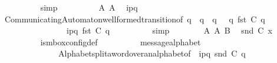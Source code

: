 \begin{isabellebody}
\ \ \ \ \ \ \ \ \isamarkupfalse%
\ simp\isanewline
\ \ \ \ \ \ \isamarkupfalse%
\ \isamarkupfalse%
\ A{}\ A{}\ \isamarkupfalse%
\ {\isachardoublequoteopen}i\isactrlbsup p{\isasymrightarrow}q\isactrlesup \ {\isasymin}\ {\isasymM}{\isachardoublequoteclose}\isanewline
\ \ \ \ \ \ \ \ \isamarkupfalse%
\ CommunicatingAutomaton{\isachardot}{\kern0pt}well{\isacharunderscore}{\kern0pt}formed{\isacharunderscore}{\kern0pt}transition{\isacharbrackleft}{\kern0pt}of\ q\ {\isachardoublequoteopen}{\isasymS}\ q{\isachardoublequoteclose}\ {\isachardoublequoteopen}{\isasymI}\ q{\isachardoublequoteclose}\ {\isasymM}\ {\isachardoublequoteopen}{\isasymR}\ q{\isachardoublequoteclose}\ {\isachardoublequoteopen}fst\ {\isacharparenleft}{\kern0pt}C{}\ q{\isacharparenright}{\kern0pt}{\isachardoublequoteclose}\isanewline
\ \ \ \ \ \ \ \ \ \ \ \ \ \ \ \ {\isachardoublequoteopen}{\isacharquery}{\kern0pt}{\isasymlangle}{\isacharparenleft}{\kern0pt}i\isactrlbsup p{\isasymrightarrow}q\isactrlesup {\isacharparenright}{\kern0pt}{\isasymrangle}{\isachardoublequoteclose}\ {\isachardoublequoteopen}fst\ {\isacharparenleft}{\kern0pt}C{}\ q{\isacharparenright}{\kern0pt}{\isachardoublequoteclose}{\isacharbrackright}{\kern0pt}\isanewline
\ \ \ \ \ \ \ \ \isamarkupfalse%
\ simp\isanewline
\ \ \ \ \ \ \isamarkupfalse%
\ A{}\ A{}\ B\ \isamarkupfalse%
\ {\isachardoublequoteopen}snd\ {\isacharparenleft}{\kern0pt}C{}\ x{\isacharparenright}{\kern0pt}\ {\isasymin}\ {\isasymM}\isactrlsup {\isacharasterisk}{\kern0pt}{\isachardoublequoteclose}\isanewline
\ \ \ \ \ \ \ \ \isamarkupfalse%
\ is{\isacharunderscore}{\kern0pt}mbox{\isacharunderscore}{\kern0pt}config{\isacharunderscore}{\kern0pt}def\isanewline
\ \ \ \ \ \ \ \ \isamarkupfalse%
\ message{\isacharunderscore}{\kern0pt}alphabet\isanewline
\ \ \ \ \ \ \ \ \ \ \ \ \ \ Alphabet{\isachardot}{\kern0pt}split{\isacharunderscore}{\kern0pt}a{\isacharunderscore}{\kern0pt}word{\isacharunderscore}{\kern0pt}over{\isacharunderscore}{\kern0pt}an{\isacharunderscore}{\kern0pt}alphabet{\isacharparenleft}{\kern0pt}{}{\isacharparenright}{\kern0pt}{\isacharbrackleft}{\kern0pt}of\ {\isasymM}\ {\isachardoublequoteopen}{\isacharbrackleft}{\kern0pt}i\isactrlbsup p{\isasymrightarrow}q\isactrlesup {\isacharbrackright}{\kern0pt}{\isachardoublequoteclose}\ {\isachardoublequoteopen}snd\ {\isacharparenleft}{\kern0pt}C{}\ q{\isacharparenright}{\kern0pt}{\isachardoublequoteclose}{\isacharbrackright}{\kern0pt}\isanewline

\end{isabellebody}
